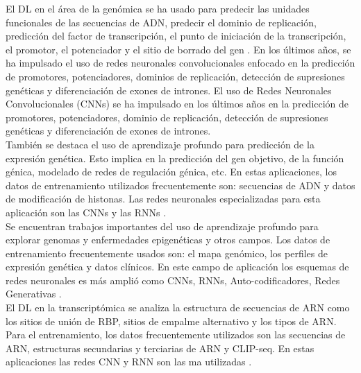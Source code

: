 El DL en el área de la genómica se ha usado para predecir las unidades funcionales de las secuencias de ADN, predecir el dominio de replicación, predicción del factor de transcripción, el punto de iniciación de la transcripción, el promotor, el potenciador y el sitio de borrado del gen \citep{quang2019factornet,umarov2017recognition,zeng2016convolutional,zhang2017titer,min2017predicting,singh2019predicting,lee2015dna}. En los últimos años, se ha impulsado el uso de redes neuronales convolucionales enfocado en la predicción de promotores, potenciadores, dominios de replicación, detección de supresiones genéticas y diferenciación de exones de intrones. El uso de Redes Neuronales Convolucionales (CNNs) se ha impulsado en los últimos años en la predicción de promotores, potenciadores, dominio de replicación, detección de supresiones genéticas y diferenciación de exones de intrones.\\

También se destaca el uso de aprendizaje profundo para predicción de la expresión genética. Esto implica en la predicción del gen objetivo, de la función génica, modelado de redes de regulación génica, etc. En estas aplicaciones, los datos de entrenamiento utilizados frecuentemente son: secuencias de ADN y datos de modificación de histonas. Las redes neuronales especializadas para esta aplicación son las CNNs y las RNNs \citep{quang2016danq,raza2016recurrent,zhou2015predicting,cuperus2017deep,koh2017denoising}.\\

Se encuentran trabajos importantes del uso de aprendizaje profundo para explorar genomas y enfermedades epigenéticas y otros campos. Los datos de entrenamiento frecuentemente usados son: el mapa genómico, los perfiles de expresión genética y datos clínicos. En este campo de aplicación los esquemas de redes neuronales es más amplió como CNNs, RNNs, Auto-codificadores, Redes Generativas \citep{liang2014integrative,yousefi2017predicting,young2017unsupervised}.\\

El DL en la transcriptómica se analiza la estructura de secuencias de ARN como los sitios de unión de RBP, sitios de empalme alternativo y los tipos de ARN. Para el entrenamiento, los datos frecuentemente utilizados son las secuencias de ARN, estructuras secundarias y terciarias de ARN y CLIP-seq. En estas aplicaciones las redes CNN y RNN son las ma utilizadas \citep{xu2017deep,zhang2017sequence,pan2017rna}.\\

